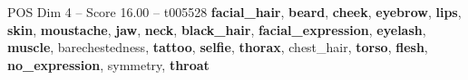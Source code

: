 \begin{textsample}{POS Dim 4 – Score 16.00 – t005528}  \label{ex:f4_pos_040}
\textbf{facial\_hair}, \textbf{beard}, \textbf{cheek}, \textbf{eyebrow}, \textbf{lips}, \textbf{skin}, \textbf{moustache}, \textbf{jaw}, \textbf{neck}, \textbf{black\_hair}, \textbf{facial\_expression}, \textbf{eyelash}, \textbf{muscle}, barechestedness, \textbf{tattoo}, \textbf{selfie}, \textbf{thorax}, chest\_hair, \textbf{torso}, \textbf{flesh}, \textbf{no\_expression}, symmetry, \textbf{throat}

\end{textsample}
